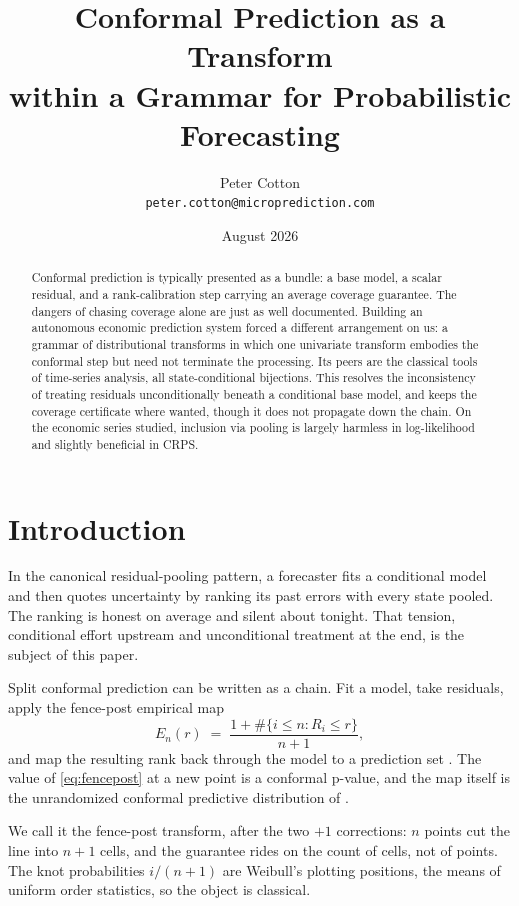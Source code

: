 \documentclass[11pt]{article}
\title{Conformal Prediction as a Transform\\ within a Grammar for Probabilistic Forecasting}
\author{Peter Cotton\\\texttt{peter.cotton@microprediction.com}}
\date{August 2026}
\theoremstyle{remark}
\begin{document}
\maketitle

\begin{abstract}
Conformal prediction is typically presented as a bundle: a base model, a scalar
residual, and a rank-calibration step carrying an average coverage guarantee. The
dangers of chasing coverage alone are just as well documented. Building an autonomous
economic prediction system forced a different arrangement on us: a grammar of
distributional transforms in which one univariate transform embodies the conformal
step but need not terminate the processing. Its peers are the classical tools of
time-series analysis, all state-conditional bijections. This resolves the
inconsistency of treating residuals unconditionally beneath a conditional base model,
and keeps the coverage certificate where wanted, though it does not propagate down
the chain. On the economic series studied, inclusion via pooling is largely harmless
in log-likelihood and slightly beneficial in CRPS.
\end{abstract}

\section{Introduction}\label{sec:intro}

In the canonical residual-pooling pattern, a forecaster fits a conditional model and
then quotes uncertainty by ranking its past errors with every state pooled. The ranking is honest on average and silent about
tonight. That tension, conditional effort upstream and unconditional treatment at the
end, is the subject of this paper.

Split conformal prediction can be written as a chain. Fit a model, take residuals, apply
the fence-post empirical map
\begin{equation}\label{eq:fencepost}
E_n(r) \;=\; \frac{1 + \#\{i \le n : R_i \le r\}}{n+1},
\end{equation}
and map the resulting rank back through the model to a prediction set
\citep{vovk2005algorithmic,lei2018distribution}. The value of \eqref{eq:fencepost} at a
new point is a conformal p-value, and the map itself is the unrandomized conformal
predictive distribution of \citet{vovk2019nonparametric}.

We call it the fence-post
transform, after the two $+1$ corrections: $n$ points cut the line into $n+1$ cells, and
the guarantee rides on the count of cells, not of points. The knot probabilities
$i/(n+1)$ are Weibull's plotting positions, the means of uniform order statistics, so the
object is classical.
\end{document}
